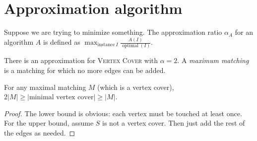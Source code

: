 \section{Approximation algorithm}
Suppose we are trying to minimize something.
The approximation ratio \(\alpha_A\) for an algorithm \(A\) is defined as
\(\max_{\text{instance}\ I} \frac{A(I)}{\operatorname{optimal}(I)}\).

There is an approximation for \textsc{Vertex Cover} with \(\alpha = 2\).
A \emph{maximum matching} is a matching for which no more edges can be added.
\begin{theorem}
	For any maximal matching \(M\) (which is a vertex cover), \(2\left|M\right| \geq \left|\text{minimal vertex cover}\right| \geq \left|M\right|\).
\end{theorem}
\begin{proof}
	The lower bound is obvious: each vertex must be touched at least once.
	For the upper bound, assume \(S\) is not a vertex cover. Then just add the rest of the edges as needed.
\end{proof}